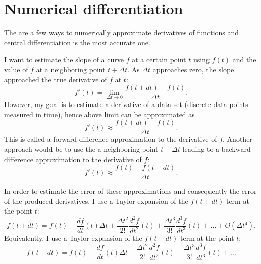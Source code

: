 \appendix
\chapter{Numerical differentiation}\label{central_diff}

The are a few ways to numerically approximate derivatives of functions and central differentiation is the most accurate one.

I want to estimate the slope of a curve $f$ at a certain point $t$ using $f(t)$ and the value of $f$ at a neighboring point $t + \Delta t$. As $\Delta t$ approaches zero, the slope approached the true derivative of $f$ at $t$:
\begin{equation}
    f'(t) = \lim_{\Delta t\to 0} \frac{f(t + dt) - f(t)}{\Delta t}.
\end{equation}
However, my goal is to estimate a derivative of a data set (discrete data points measured in time), hence above limit can be approximated as
\begin{equation}\label{eq:forward}
    f'(t) \approx \frac{f(t + dt) - f(t)}{\Delta t}.
\end{equation}
This is called a forward difference approximation to the derivative of $f$. Another approach would be to use the a neighboring point $t - \Delta t$ leading to a backward difference approximation to the derivative of $f$:
\begin{equation}\label{eq:backward}
    f'(t) \approx \frac{f(t) - f(t - dt)}{\Delta t}.
\end{equation}

In order to estimate the error of these approximations and consequently the error of the produced derivatives, I use a Taylor expansion of the $f(t + dt)$ term at the point $t$:
\begin{equation}\label{eq:forward_error}
    f(t + dt) = f(t) + \frac{df}{dt}(t) \Delta t + \frac{\Delta t^{2}}{2!} \frac{d^{2}f}{dt^{2}}(t) + \frac{\Delta t^{3}}{3!} \frac{d^{3}f}{dt^{3}}(t) + ... + O(\Delta t^{4}).
\end{equation}
Equivalently, I use a Taylor expansion of the $f(t - dt)$ term at the point $t$:
\begin{equation}\label{eq:backward_error}
    f(t - dt) = f(t) - \frac{df}{dt}(t) \Delta t + \frac{\Delta t^{2}}{2!} \frac{d^{2}f}{dt^{2}}(t) - \frac{\Delta t^{3}}{3!} \frac{d^{3}f}{dt^{3}}(t) + ... 
\end{equation}

